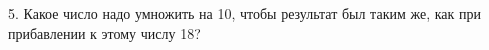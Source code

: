 5. Какое число надо умножить на 10, чтобы результат был таким же, как при прибавлении к этому числу 18?\\
